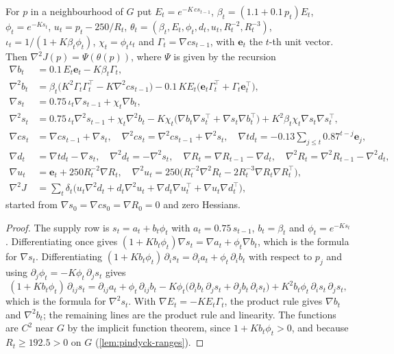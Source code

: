 \begin{lemma}\label{lem:pindyck-hessian}
For $p$ in a neighbourhood of $G$ put
$E_t=e^{-K\,cs_{t-1}}$, $\beta_t=(1.1+0.1\,p_t)E_t$, $\phi_t=e^{-K s_t}$, $u_t=p_t-250/R_t$,
$\theta_t=(\beta_t,E_t,\phi_t,d_t,u_t,R_t^{-2},R_t^{-3})$,
$\iota_t=1/(1+K\beta_t\phi_t)$, $\chi_t=\phi_t\iota_t$ and $\Gamma_t=\nabla cs_{t-1}$, with $\mathbf e_t$ the $t$-th unit vector.
Then $\nabla^2J(p)=\Psi(\theta(p))$, where $\Psi$ is given by the recursion
\begin{align*}
\nabla b_t&=0.1\,E_t\mathbf e_t-K\beta_t\Gamma_t,\\
\nabla^2b_t&=\beta_t\bigl(K^2\Gamma_t\Gamma_t^\top-K\nabla^2cs_{t-1}\bigr)-0.1\,K E_t\bigl(\mathbf e_t\Gamma_t^\top+\Gamma_t\mathbf e_t^\top\bigr),\\
\nabla s_t&=0.75\,\iota_t\nabla s_{t-1}+\chi_t\nabla b_t,\\
\nabla^2s_t&=0.75\,\iota_t\nabla^2s_{t-1}+\chi_t\nabla^2b_t-K\chi_t\bigl(\nabla b_t\nabla s_t^\top+\nabla s_t\nabla b_t^\top\bigr)+K^2\beta_t\chi_t\nabla s_t\nabla s_t^\top,\\
\nabla cs_t&=\nabla cs_{t-1}+\nabla s_t,\quad \nabla^2cs_t=\nabla^2cs_{t-1}+\nabla^2s_t,\quad
\nabla td_t=-0.13\textstyle\sum_{j\le t}0.87^{t-j}\mathbf e_j,\\
\nabla d_t&=\nabla td_t-\nabla s_t,\quad \nabla^2d_t=-\nabla^2s_t,\quad \nabla R_t=\nabla R_{t-1}-\nabla d_t,\quad \nabla^2R_t=\nabla^2R_{t-1}-\nabla^2d_t,\\
\nabla u_t&=\mathbf e_t+250R_t^{-2}\nabla R_t,\quad \nabla^2u_t=250\bigl(R_t^{-2}\nabla^2R_t-2R_t^{-3}\nabla R_t\nabla R_t^\top\bigr),\\
\nabla^2J&=\textstyle\sum_t\delta_t\bigl(u_t\nabla^2d_t+d_t\nabla^2u_t+\nabla d_t\nabla u_t^\top+\nabla u_t\nabla d_t^\top\bigr),
\end{align*}
started from $\nabla s_0=\nabla cs_0=\nabla R_0=0$ and zero Hessians.
\end{lemma}

\begin{proof}
The supply row is $s_t=a_t+b_t\phi_t$ with $a_t=0.75\,s_{t-1}$, $b_t=\beta_t$ and $\phi_t=e^{-Ks_t}$.
Differentiating once gives $(1+Kb_t\phi_t)\nabla s_t=\nabla a_t+\phi_t\nabla b_t$, which is the formula for $\nabla s_t$.
Differentiating $(1+Kb_t\phi_t)\,\partial_is_t=\partial_ia_t+\phi_t\,\partial_ib_t$ with respect to $p_j$ and using $\partial_j\phi_t=-K\phi_t\,\partial_js_t$ gives
\[
(1+Kb_t\phi_t)\,\partial_{ij}s_t=\partial_{ij}a_t+\phi_t\,\partial_{ij}b_t-K\phi_t\bigl(\partial_ib_t\,\partial_js_t+\partial_jb_t\,\partial_is_t\bigr)+K^2b_t\phi_t\,\partial_is_t\,\partial_js_t,
\]
which is the formula for $\nabla^2s_t$.
With $\nabla E_t=-KE_t\Gamma_t$, the product rule gives $\nabla b_t$ and $\nabla^2b_t$; the remaining lines are the product rule and linearity.
The functions are $C^2$ near $G$ by the implicit function theorem, since $1+Kb_t\phi_t>0$, and because $R_t\ge192.5>0$ on $G$ (\cref{lem:pindyck-ranges}).
\end{proof}

